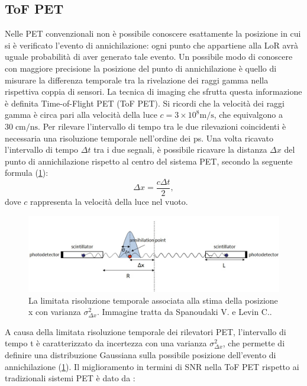 \subsection{ToF PET}
Nelle PET convenzionali non è possibile conoscere esattamente la posizione in cui si è verificato l'evento di annichilazione: ogni punto che appartiene alla LoR avrà uguale probabilità di aver generato tale evento. Un possibile modo di conoscere con maggiore precisione la posizione del punto di annichilazione è quello di misurare la differenza temporale tra la rivelazione dei raggi gamma nella rispettiva coppia di sensori. La tecnica di imaging che sfrutta questa informazione è definita Time-of-Flight PET (ToF PET). Si ricordi che la velocità dei raggi gamma è circa pari alla velocità della luce $c=3 \times 10^8 \text{m/s}$, che equivalgono a $30  \; \text{cm/ns}$. Per rilevare l'intervallo di tempo tra le due rilevazioni coincidenti è necessaria una risoluzione temporale nell'ordine dei \unit{\pico\second}. Una volta ricavato l'intervallo di tempo $\Delta t$ tra i due segnali, è possibile ricavare la distanza $\Delta x$ del punto di annichilazione rispetto al centro del sistema PET, secondo la seguente formula (\Fig\ref{fig:tof_distribution})\cite{Spanoudaki2010}:
\begin{equation}
	\Delta x=\frac{c\Delta t}{2},
\end{equation}
dove $c$ rappresenta la velocità della luce nel vuoto.
\begin{figure}[tbh]
	\centering
	\includegraphics[width=\linewidth]{./ImageFiles/tof_distribution.jpg}
	\caption{La limitata risoluzione temporale associata alla stima della posizione \textDelta x con varianza $\sigma^2_{\Delta x}$. Immagine tratta da Spanoudaki V. e Levin C.\cite{Spanoudaki2010}.}
	\label{fig:tof_distribution}
\end{figure}
A causa della limitata risoluzione temporale dei rilevatori PET, l'intervallo di tempo \textDelta t è caratterizzato da incertezza con una varianza $\sigma^2_{\Delta x}$, che permette di definire una distribuzione Gaussiana sulla possibile posizione dell'evento di annichilazione (\Fig\ref{fig:tof_distribution}). Il miglioramento in termini di SNR nella ToF PET rispetto ai tradizionali sistemi PET è dato da \cite{Jiang2019}:
